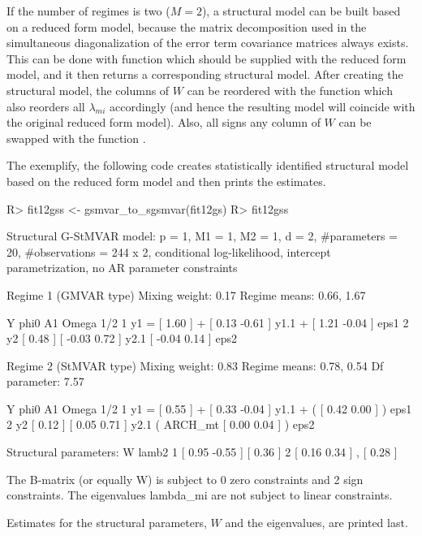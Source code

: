 \documentclass[nojss]{jss}
\begin{document}
If the number of regimes is two ($M=2$), a structural model can be built based on a reduced form model, because the matrix decomposition used in the simultaneous diagonalization of the error term covariance matrices always exists. This can be done with function  which should be supplied with the reduced form model, and it then returns a corresponding structural model. After creating the structural model, the columns of $W$ can be reordered with the function  which also reorders all $\lambda_{mi}$ accordingly (and hence the resulting model will coincide with the original reduced form model). Also, all signs any column of $W$ can be swapped with the function .

The exemplify, the following code creates statistically identified structural model based on the reduced form model  and then prints the estimates.
%
\begin{CodeChunk}
\begin{CodeInput}
R> fit12gss <- gsmvar_to_sgsmvar(fit12gs)
R> fit12gss
\end{CodeInput}
\begin{CodeOutput}
Structural G-StMVAR model:
 p = 1, M1 = 1, M2 = 1, d = 2, #parameters = 20, #observations = 244 x 2,
 conditional log-likelihood, intercept parametrization, no AR parameter
 constraints

Regime 1 (GMVAR type)
Mixing weight: 0.17
Regime means: 0.66, 1.67

   Y     phi0          A1                  Omega         1/2
1 y1 = [ 1.60 ] + [  0.13 -0.61 ] y1.1 + [  1.21 -0.04 ]     eps1
2 y2   [ 0.48 ]   [ -0.03  0.72 ] y2.1   [ -0.04  0.14 ]     eps2

Regime 2 (StMVAR type)
Mixing weight: 0.83
Regime means: 0.78, 0.54
Df parameter:  7.57

   Y     phi0          A1                            Omega          1/2
1 y1 = [ 0.55 ] + [  0.33 -0.04 ] y1.1 + (         [  0.42 0.00 ] )     eps1
2 y2   [ 0.12 ]   [  0.05  0.71 ] y2.1   ( ARCH_mt [  0.00 0.04 ] )     eps2

Structural parameters:
        W             lamb2
1 [  0.95 -0.55 ]   [  0.36 ]
2 [  0.16  0.34 ] , [  0.28 ]

The B-matrix (or equally W) is subject to 0 zero constraints and 2 sign
constraints. The eigenvalues lambda_{mi} are not subject to linear constraints.
\end{CodeOutput}
\end{CodeChunk}
%
Estimates for the structural parameters, $W$ and the eigenvalues, are printed last.
\end{document}
